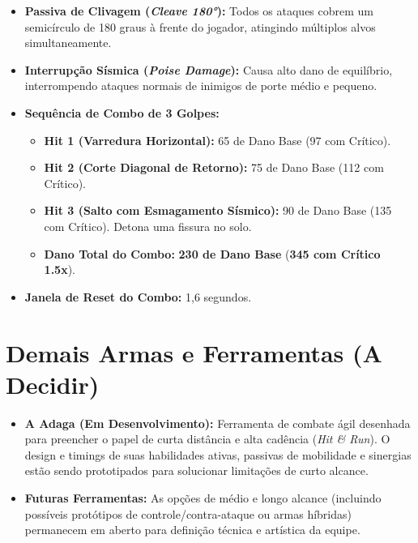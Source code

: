 \documentclass[a4paper,12pt]{report}
\begin{document}
\begin{itemize}
    \item \textbf{Passiva de Clivagem (\textit{Cleave 180°}):} Todos os ataques cobrem um semicírculo de 180 graus à frente do jogador, atingindo múltiplos alvos simultaneamente.
    \item \textbf{Interrupção Sísmica (\textit{Poise Damage}):} Causa alto dano de equilíbrio, interrompendo ataques normais de inimigos de porte médio e pequeno.
    \item \textbf{Sequência de Combo de 3 Golpes:}
    \begin{itemize}
        \item \textbf{Hit 1 (Varredura Horizontal):} 65 de Dano Base (97 com Crítico).
        \item \textbf{Hit 2 (Corte Diagonal de Retorno):} 75 de Dano Base (112 com Crítico).
        \item \textbf{Hit 3 (Salto com Esmagamento Sísmico):} 90 de Dano Base (135 com Crítico). Detona uma fissura no solo.
        \item \textbf{Dano Total do Combo:} \textbf{230 de Dano Base} (\textbf{345 com Crítico 1.5x}).
    \end{itemize}
    \item \textbf{Janela de Reset do Combo:} 1,6 segundos.
\end{itemize}

\section{Demais Armas e Ferramentas (A Decidir)}
\begin{itemize}
    \item \textbf{A Adaga (Em Desenvolvimento):} Ferramenta de combate ágil desenhada para preencher o papel de curta distância e alta cadência (\textit{Hit \& Run}). O design e timings de suas habilidades ativas, passivas de mobilidade e sinergias estão sendo prototipados para solucionar limitações de curto alcance.
    \item \textbf{Futuras Ferramentas:} As opções de médio e longo alcance (incluindo possíveis protótipos de controle/contra-ataque ou armas híbridas) permanecem em aberto para definição técnica e artística da equipe.
\end{itemize}

\end{document}
